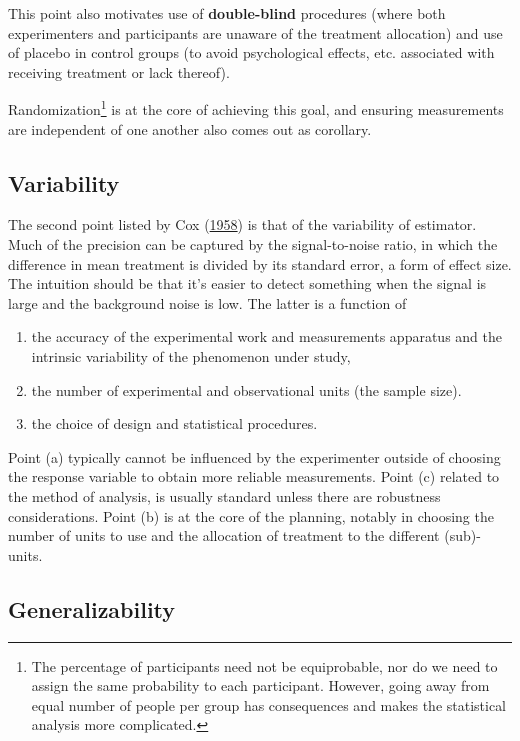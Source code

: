 \documentclass[
  11pt,
  letterpaper,
]{scrbook}
\providecommand{\tightlist}{%
  \setlength{\itemsep}{0pt}\setlength{\parskip}{0pt}}\usepackage{longtable,booktabs,array}
\theoremstyle{definition}
\theoremstyle{remark}
\begin{document}
This point also motivates use of \textbf{double-blind} procedures (where
both experimenters and participants are unaware of the treatment
allocation) and use of placebo in control groups (to avoid psychological
effects, etc. associated with receiving treatment or lack thereof).

Randomization\footnote{The percentage of participants need not be
  equiprobable, nor do we need to assign the same probability to each
  participant. However, going away from equal number of people per group
  has consequences and makes the statistical analysis more complicated.}
is at the core of achieving this goal, and ensuring measurements are
independent of one another also comes out as corollary.

\hypertarget{variability}{%
\subsection{Variability}\label{variability}}

The second point listed by Cox (\protect\hyperlink{ref-Cox:1958}{1958})
is that of the variability of estimator. Much of the precision can be
captured by the signal-to-noise ratio, in which the difference in mean
treatment is divided by its standard error, a form of effect size. The
intuition should be that it's easier to detect something when the signal
is large and the background noise is low. The latter is a function of

\begin{enumerate}
\def\labelenumi{(\alph{enumi})}
\tightlist
\item
  the accuracy of the experimental work and measurements apparatus and
  the intrinsic variability of the phenomenon under study,
\item
  the number of experimental and observational units (the sample size).
\item
  the choice of design and statistical procedures.
\end{enumerate}

Point (a) typically cannot be influenced by the experimenter outside of
choosing the response variable to obtain more reliable measurements.
Point (c) related to the method of analysis, is usually standard unless
there are robustness considerations. Point (b) is at the core of the
planning, notably in choosing the number of units to use and the
allocation of treatment to the different (sub)-units.

\hypertarget{generalizability}{%
\subsection{Generalizability}\label{generalizability}}
\end{document}
